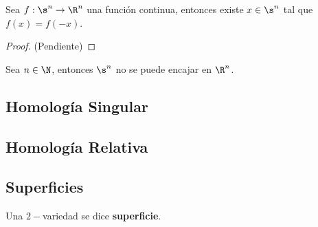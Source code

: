 \documentclass{article}
\begin{document}
\begin{teo}
    Sea $f:\s^{n}\to\R^{n}$ una función continua, entonces existe $x\in\s^{n}$ tal que 
    $f(x)=f(-x)$.
\end{teo}

\begin{proof}
    (Pendiente)
\end{proof}

\vspace{2mm}
\begin{cor}
    Sea $n\in\N$, entonces $\s^{n}$ no se puede encajar en $\R^{n}$.
\end{cor}

\newpage
\subsection{Homología Singular}

\newpage
\subsection{Homología Relativa}

\newpage
\subsection{Superficies}
\begin{dfn}
    Una $2-$variedad se dice \textbf{superficie}.
\end{dfn}
\end{document}
